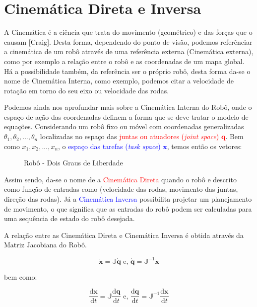 \section{Cinemática Direta e Inversa}\label{intro-ch1}

A Cinemática é a ciência que trata do movimento (geométrico) e das forças que o causam [Craig]. Desta forma, dependendo do ponto de visão,
podemos referênciar a cinemática de um robô através de uma referência externa (Cinemática externa), como por exemplo a relação entre o robô e
as coordenadas de um mapa global. Há a possibilidade também, da referência ser o próprio robô, desta forma da-se o nome de
Cinemática Interna, como exemplo, podemos citar a velocidade de rotação em torno do seu eixo ou velocidade das rodas.

Podemos ainda nos aprofundar mais sobre a Cinemática Interna do Robô, onde o espaço de ação das coordenadas definem a forma que se deve tratar o modelo de equações.
Considerando um robô fixo ou móvel com coordenadas generalizadas $\theta_1, \theta_2,..., \theta_n$ localizadas no espaço das \textcolor{red}{juntas ou atuadores (\textit{joint space}) $\mathbf{q}$}. Bem como $x_1, x_2,..., x_n$, o \textcolor{blue}{espaço das tarefas (\textit{task space}) $\mathbf{x}$}, temos então os vetores:

\begin{figure}[!ht]

\caption{Robô - Dois Graus de Liberdade}
\label{fig:2dof-robot}
\end{figure}

Assim sendo, da-se o nome de a \textcolor{red}{Cinemática Direta} quando o robô e descrito como função de entradas como (velocidade das rodas, movimento das juntas, direção das rodas).  Já a \textcolor{blue}{Cinemática Inversa} possibilita projetar um planejamento de movimento, o que significa que as entradas do robô podem ser calculadas para uma sequência de estado do robô desejada.

A relação entre as Cinemática Direta e Cinemática Inversa é obtida através da Matriz Jacobiana do Robô.

\begin{equation*}
    \mathbf{\dot{x}} = \mathbb{J}{\mathbf{\dot{q}}}
    \text{ e, }
    \mathbf{\dot{q}} = \mathbb{J}^{-1}{\mathbf{\dot{x}}}
\end{equation*}

\noindent bem como:

\begin{equation*}
    \frac{\text{d}\mathbf{x}}{\text{d}t} = \mathbb{J}\frac{\text{d}\mathbf{q}}{\text{d}t}
    \text{ e, }
    \frac{\text{d}\mathbf{q}}{\text{d}t} = \mathbb{J}^{-1}\frac{\text{d}\mathbf{x}}{\text{d}t}
\end{equation*}

